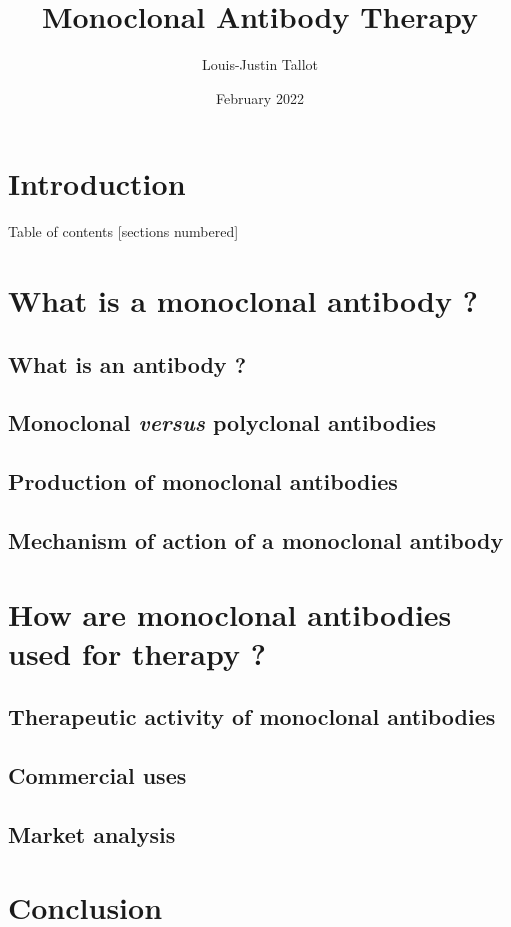 \documentclass{beamer}
\title{
  \textbf{Monoclonal Antibody Therapy}
}
\author{Louis-Justin Tallot}
\date{February 2022}
\begin{document}
  \maketitle





  \section*{Introduction}
  

  \begin{frame}{Table of contents}
    [sections numbered]
    \tableofcontents
  \end{frame}

  \section{What is a monoclonal antibody ?}

    \subsection{What is an antibody ?}
    

    \subsection{Monoclonal \textit{versus} polyclonal antibodies}
    

    \subsection{Production of monoclonal antibodies}
    

    \subsection{Mechanism of action of a monoclonal antibody}
    

  \section{How are monoclonal antibodies used for therapy ?}

    \subsection{Therapeutic activity of monoclonal antibodies}
    

    \subsection{Commercial uses}
    

    \subsection{Market analysis}
  
  
  \section*{Conclusion}
\end{document}
